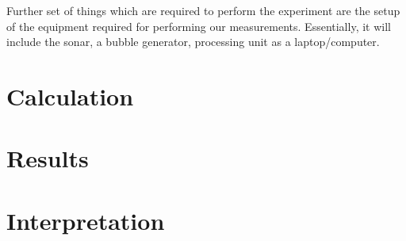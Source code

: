 \documentclass[11pt]{article}
\begin{document}
Further set of things which are required to perform the experiment are the setup of the equipment required for performing our measurements. 
Essentially, it will include the sonar, a bubble generator, processing unit as a laptop/computer.



\section{Calculation}






\section{Results}




\section{Interpretation}


\end{document}
